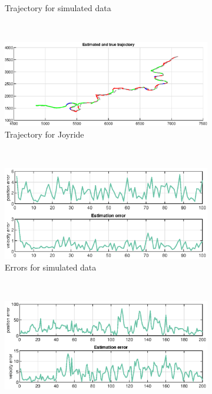 \begin{figure}[ht]
\begin{subfigure}[h]{0.4\textwidth}
        \caption{Trajectory for simulated data}
        \label{fig:ga_1_2_estimated_trajectory}
    \end{subfigure}%
    ~
    \begin{subfigure}[h]{0.4\textwidth}
        \includegraphics[width=\textwidth]{figures/ga_1/joyride_estimated_trajectory}
        \caption{Trajectory for Joyride}
        \label{fig:ga_1_joyride_estimated_trajectory}
    \end{subfigure}
        \\
    \begin{subfigure}[h]{0.4\textwidth}
        \includegraphics[width=\textwidth]{figures/ga_1/2_error}
        \caption{Errors for simulated data}
        \label{fig:ga_1_2_error}
    \end{subfigure}%
    ~
    \begin{subfigure}[h]{0.4\textwidth}
        \includegraphics[width=\textwidth]{figures/ga_1/joyride_error}

\end{subfigure}
\end{figure}
